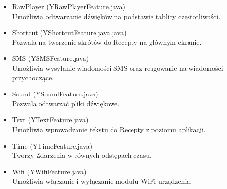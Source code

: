 \documentclass[11pt,a4paper,polish,thesis]{dcsbook}
\begin{document}
\begin{itemize}
\item{RawPlayer (YRawPlayerFeature.java)}\\
Umożliwia odtwarzanie dźwięków na podstawie tablicy częstotliwości.

\item{Shortcut (YShortcutFeature.java.java)}\\
Pozwala na tworzenie skrótów do Recepty na głównym ekranie.

\item{SMS (YSMSFeature.java)}\\
Umożliwia wysyłanie wiadomości SMS oraz reagowanie na wiadomości przychodzące.

\item{Sound (YSoundFeature.java)}\\
Pozwala odtwarzać pliki dźwiękowe.

\item{Text (YTextFeature.java)}\\
Umożliwia wprowadzanie tekstu do Recepty z poziomu aplikacji.

\item{Time (YTimeFeature.java)}\\
Tworzy Zdarzenia w równych odstępach czasu.

\item{Wifi (YWifiFeature.java)}\\
Umożliwia włączanie i wyłączanie modułu WiFi urządzenia.

\end{itemize}
\end{document}
